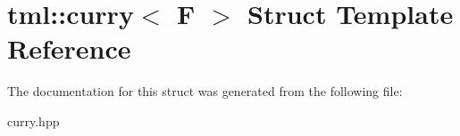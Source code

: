 \hypertarget{structtml_1_1curry}{\section{tml\+:\+:curry$<$ F $>$ Struct Template Reference}
\label{structtml_1_1curry}
}


The documentation for this struct was generated from the following file\+:\begin{DoxyCompactItemize}
\item 
curry.\+hpp\end{DoxyCompactItemize}
